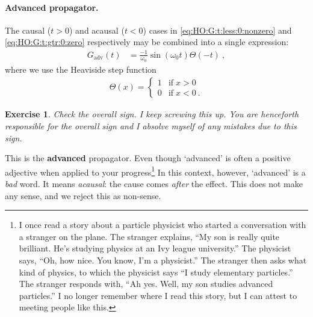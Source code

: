 \documentclass[
  11pt,
	colorful,
	raggedright,
]{tufte-style-thesis-flip}
\newtheorem{exercise}{Exercise}[section]
\begin{document}
\paragraph{Advanced propagator.}
The causal ($t>0$) and acausal ($t<0$) cases in \eqref{eq:HO:G:t:less:0:nonzero} and \eqref{eq:HO:G:t:gtr:0:zero} respectively may be combined into a single expression:
\begin{align}
  G_\text{adv}(t) &= \frac{-1}{\omega_0}\sin(\omega_0t) \Theta(-t) \ ,
  \label{eq:HO:G:adv:theta}
\end{align}
where we use the Heaviside step function
\begin{align}
  \Theta(x) = 
  \begin{cases}
  1 & \text{if}\; x>0\\
  0 & \text{if}\; x<0 \ .
  \end{cases}
  \label{eq:Heaviside:Theta}
\end{align}
\begin{exercise}
Check the overall sign. I keep screwing this up. You are henceforth responsible for the overall sign and I absolve myself of any mistakes due to this sign.
\end{exercise}
This is the \textbf{advanced} propagator. Even though `advanced' is often a positive adjective when applied to your progress\footnote{I once read a story about a particle physicist who started a conversation with a stranger on the plane. The stranger explains, ``My son is really quite brilliant. He's studying physics at an Ivy league university.'' The physicist says, ``Oh, how nice. You know, I'm a physicist.''  The stranger then asks what kind of physics, to which the physicist says ``I study elementary particles.'' The stranger responds with, ``Ah yes. Well, my son studies advanced particles.'' I no longer remember where I read this story, but I can attest to meeting people like this.} In this context, however, `advanced' is a \emph{bad} word. It means \emph{acausal}: the cause comes \emph{after} the effect. This does not make any sense, and we reject this as non-sense. 
\end{document}
